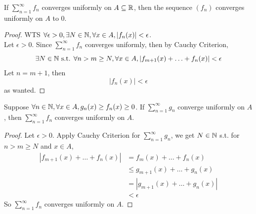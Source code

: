 \documentclass[11pt]{article}
\begin{document}
\corollary If $\sum_{n=1}^\infty f_n$ converges uniformly on $A \subseteq \mathbb{R}$, then the sequence $(f_n)$ converges uniformly on $A$ to 0.
\begin{proof}
	WTS $\forall \epsilon > 0, \exists N \in \mathbb{N}, \forall x \in A, |f_n(x)| < \epsilon$.\\
	Let $\epsilon > 0$. Since $\sum_{n=1}^\infty f_n$ converges uniformly, then by Cauchy Criterion, 
	$$\exists N \in \mathbb{N} \text{ s.t. } \forall n > m \geq N, \forall x \in A, |f_{m+1}(x) + \hdots + f_n(x)|< \epsilon$$
	Let $n = m+1$, then
	$$|f_n(x)| < \epsilon$$
	as wanted.
\end{proof}

\corollary Suppose $\forall n \in \mathbb{N}, \forall x \in A, g_n(x) \geq f_n(x) \geq 0$. If $\sum_{n=1}^\infty g_n$ converge uniformly on $A$, then $\sum_{n=1}^\infty f_n$ converges uniformly on $A$.
\begin{proof}
	Let $\epsilon > 0$. Apply Cauchy Criterion for $\sum_{n=1}^\infty g_n$, we get $N \in \mathbb{N}$ s.t. for $n > m \geq N$ and $x \in A$,
	\begin{align*}
		|f_{m+1}(x) + \hdots + f_n(x) | &= f_m(x) + \hdots + f_n(x) \\
		&\leq g_{m+1}(x) + \hdots + g_n(x) \\
		&= |g_{m+1}(x) + \hdots + g_n(x) |\\
		&< \epsilon
	\end{align*}
So $\sum_{n=1}^\infty f_n$ converges uniformly on $A$.
\end{proof}
\end{document}
